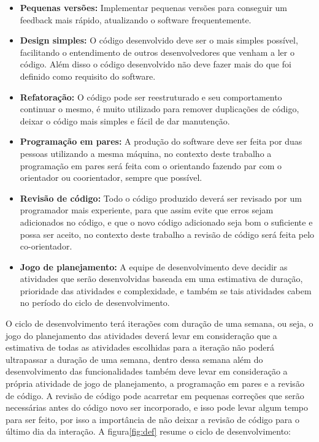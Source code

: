 \begin{itemize}
  \item \textbf{Pequenas versões:} Implementar pequenas versões para conseguir
  um feedback mais rápido, atualizando o software frequentemente.
  \item \textbf{Design simples:} O código desenvolvido deve ser o mais simples possível,
  facilitando o entendimento de outros desenvolvedores que venham a ler o código.
  Além disso o código desenvolvido não deve fazer mais do que foi definido como
  requisito do software.
  \item \textbf{Refatoração:} O código pode ser reestruturado e seu comportamento
  continuar o mesmo, é muito utilizado para remover duplicações de código, deixar
  o código mais simples e fácil de dar manutenção.
  \item \textbf{Programação em pares:} A produção do software deve ser feita por duas
  pessoas utilizando a mesma máquina, no contexto deste trabalho a programação
  em pares será feita com o orientando fazendo par com o orientador ou coorientador,
  sempre que possível.
  \item \textbf{Revisão de código:} Todo o código produzido deverá ser revisado
  por um programador mais experiente, para que assim evite que erros sejam
  adicionados no código, e que o novo código adicionado seja bom o suficiente
  e possa ser aceito, no contexto deste trabalho a revisão de código será
  feita pelo co-orientador.
  \item \textbf{Jogo de planejamento:} A equipe de desenvolvimento deve decidir
  as atividades que serão desenvolvidas baseada em uma estimativa de duração,
  prioridade das atividades e complexidade, e também se tais atividades cabem
  no período do ciclo de desenvolvimento.
\end{itemize}

O ciclo de desenvolvimento terá iterações com duração de uma semana, ou seja,
o jogo do planejamento das atividades deverá levar em consideração que a
estimativa de todas as atividades escolhidas para a iteração não poderá
ultrapassar a duração de uma semana, dentro dessa semana além do desenvolvimento
das funcionalidades também deve levar em consideração a própria atividade de jogo
de planejamento, a programação em pares e a revisão de código. A revisão de código
pode acarretar em pequenas correções que serão necessárias antes do código novo
ser incorporado, e isso pode levar algum tempo para ser feito, por isso a importância
de não deixar a revisão de código para o último dia da interação. A figura\ref{fig:def}
resume o ciclo de desenvolvimento:

